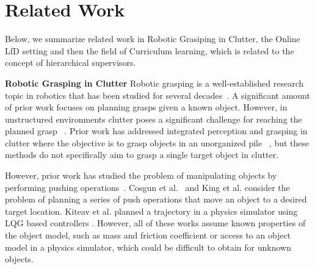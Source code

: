 \documentclass[10pt, conference]{ieeeconf}      %
\newcommand{\mlnote}[1]{\ifthenelse{ \boolean{include-notes}}%
 {\textcolor{purple}{\textbf{ML: #1}}}{}}
\begin{document}


\section{Related Work}
Below, we summarize related work in Robotic Grasiping in Clutter, the Online LfD setting and then the field of
Curriculum learning, which is related to the concept of hierarchical supervisors.

\noindent \textbf{Robotic Grasping in Clutter}
Robotic grasping is a well-established research topic in robotics that has been studied for several
decades~\cite{bicchi2000robotic}. A significant amount of prior work focuses on planning grasps given a known object.
However, in unstructured environments clutter poses a significant challenge for reaching the planned grasp
~\cite{katz2008can}. Prior work has addressed integrated perception and grasping in clutter where the objective is to
grasp objects in an unorganized pile ~\cite{pinto2015supersizing,nieuwenhuisen2013mobile}, but these methods do not
specifically aim to grasp a single target object in clutter. 

However, prior work has studied the problem of manipulating objects
by performing pushing operations~\cite{mason1986mechanics}.  Cosgun et al.~\cite{cosgun2011push} and King et al. \cite{kingnonprehensile} consider the problem of planning
a series of push operations that move an object to a
desired target location. Kiteav et al. planned a trajectory in a physics simulator using LQG based controllers
\cite{kitaevphysics}. However, all of these works assume known properties of the object model, such as mass and friction coefficient  or access to an object model in a physics simulator, which could be difficult to obtain for unknown objects. 
\end{document}
